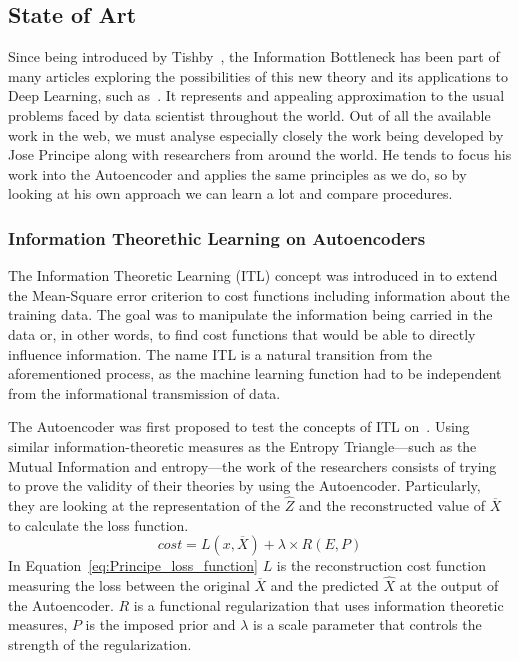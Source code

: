 \subsection{State of Art}

Since being introduced by Tishby~\cite{Inf_Bottleneck_first}, the Information Bottleneck has been part of many articles exploring the possibilities of this new theory and its applications to Deep Learning, such as~\cite{State_of_Art}. It represents and appealing approximation to the usual problems faced by data scientist throughout the world. Out of all the available work in the web, we must analyse especially closely the work being developed by Jose Principe along with researchers from around the world. He tends to focus his work into the Autoencoder and applies the same principles as we do, so by looking at his own approach we can learn a lot and compare procedures.

\subsubsection{Information Theorethic Learning on Autoencoders}

The Information Theoretic Learning (ITL) concept was introduced in \cite{Principe_2000} to extend the Mean-Square error criterion to cost functions including information about the training data. The goal was to manipulate the information being carried in the data or, in other words, to find cost functions that would be able to directly influence information. The name ITL is a natural transition from the aforementioned process, as the machine learning function had to be independent from the informational transmission of data. 

The Autoencoder was first proposed to test the concepts of ITL on~\cite{Santana_2016}. Using similar information-theoretic measures as the Entropy Triangle---such as the Mutual Information and entropy---the work of the researchers consists of trying to prove the validity of their theories by using the Autoencoder. Particularly, they are looking at the representation of the $\hat{Z}$ and the reconstructed value of $\overline{X}$ to calculate the loss function.
\begin{equation}
\label{eq:Principe_loss_function}
cost = L(x,\overline{X}) + \lambda \times R(E,P)
\end{equation}
In Equation~\eqref{eq:Principe_loss_function} $L$ is the reconstruction cost function measuring the loss between the original $\overline X$ and the predicted $\hat{X}$ at the output of the Autoencoder. $R$ is a functional regularization that uses information theoretic measures, $P$ is the imposed prior and $\lambda$ is a scale parameter that controls the strength of the regularization.

